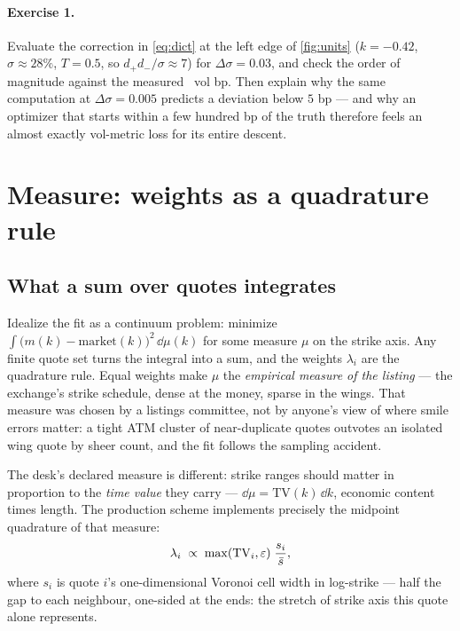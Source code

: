 \documentclass[11pt]{article}
\begin{document}
\paragraph{Exercise 1.}
Evaluate the correction in \eqref{eq:dict} at the left edge of
\cref{fig:units} ($k=-0.42$, $\sigma\approx28\%$, $T=0.5$, so
$d_+d_-/\sigma\approx7$) for $\Delta\sigma=0.03$, and check the order of
magnitude against the measured \objmunitserrbig\ vol bp.  Then explain why
the same computation at $\Delta\sigma=0.005$ predicts a deviation below
$5$ bp --- and why an optimizer that starts within a few hundred bp of the
truth therefore feels an almost exactly vol-metric loss for its entire
descent.

\section{Measure: weights as a quadrature rule}
\label{sec:measure}

\subsection{What a sum over quotes integrates}

Idealize the fit as a continuum problem: minimize
$\int\big(m(k)-\text{market}(k)\big)^2\,\dd\mu(k)$ for some measure $\mu$
on the strike axis.  Any finite quote set turns the integral into a sum,
and the weights $\lambda_i$ are the quadrature rule.  Equal weights make
$\mu$ the \emph{empirical measure of the listing} --- the exchange's
strike schedule, dense at the money, sparse in the wings.  That measure
was chosen by a listings committee, not by anyone's view of where smile
errors matter: a tight ATM cluster of near-duplicate quotes outvotes an
isolated wing quote by sheer count, and the fit follows the sampling
accident.

The desk's declared measure is different: strike ranges should matter in
proportion to the \emph{time value} they carry ---
$\dd\mu=\mathrm{TV}(k)\,\dd k$, economic content times length.  The
production scheme implements precisely the midpoint quadrature of that
measure:
\begin{equation}
\lambda_i\;\propto\;\max(\mathrm{TV}_i,\varepsilon)\;\frac{s_i}{\bar s},
\label{eq:tvweights}
\end{equation}
where $s_i$ is quote $i$'s one-dimensional Voronoi cell width in
log-strike --- half the gap to each neighbour, one-sided at the ends: the
stretch of strike axis this quote alone represents.
\end{document}
